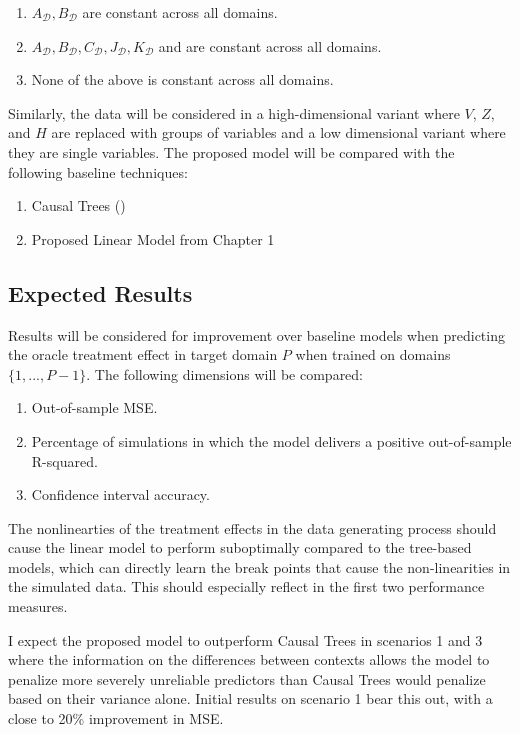 \documentclass[a4paper,12pt]{article}
\DeclareMathOperator*{\D}{\mathcal{D}}
\begin{document}
\begin{enumerate}
\item $A_{\D}, B_{\D}$ are constant across all domains.
\item $A_{\D}, B_{\D}, C_{\D}, J_{\D}, K_{\D}$ and are constant across all domains.
\item None of the above is constant across all domains.
\end{enumerate}

Similarly, the data will be considered in a high-dimensional variant where $V$, $Z$, and $H$ are replaced with groups of variables and a low dimensional variant where they are single variables. The proposed model will be compared with the following baseline techniques:

\begin{enumerate}
\item Causal Trees (\cite{Athey2016})
\item Proposed Linear Model from Chapter 1
\end{enumerate}



\subsection{ Expected Results }

Results will be considered for improvement over baseline models when predicting the oracle treatment effect in target domain $P$ when trained on domains $\{1,...,P-1\}$. The following dimensions will be compared:

\begin{enumerate}
\item Out-of-sample MSE.
\item Percentage of simulations in which the model delivers a positive out-of-sample R-squared.
\item Confidence interval accuracy.
\end{enumerate}

The nonlinearties of the treatment effects in the data generating process should cause the linear model to perform suboptimally compared to the tree-based models, which can directly learn the break points that cause the non-linearities in the simulated data. This should especially reflect in the first two performance measures.

I expect the proposed model to outperform Causal Trees in scenarios 1 and 3 where the information on the differences between contexts allows the model to penalize more severely unreliable predictors than Causal Trees would penalize based on their variance alone. Initial results on scenario 1 bear this out, with a close to 20\% improvement in MSE.
\end{document}
